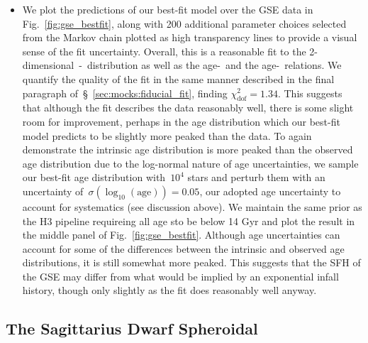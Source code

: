 \documentclass[ms.tex]{subfiles}
\begin{document}
\begin{itemize}
	\item We plot the predictions of our best-fit model over the GSE data in
	Fig.~\ref{fig:gse_bestfit}, along with 200 additional parameter choices
	selected from the Markov chain plotted as high transparency lines to
	provide a visual sense of the fit uncertainty.
	Overall, this is a reasonable fit to the
	2-dimensional~\afe-\feh~distribution as well as the age-\feh~and the
	age-\afe~relations.
	We quantify the quality of the fit in the same manner described in the
	final paragraph of~\S~\ref{sec:mocks:fiducial_fit}, finding
	$\chi_\text{dof}^2 = 1.34$.
	This suggests that although the fit describes the data reasonably well,
	there is some slight room for improvement, perhaps in the age distribution
	which our best-fit model predicts to be slightly more peaked than the data.
	To again demonstrate the intrinsic age distribution is more peaked than the
	observed age distribution due to the log-normal nature of age uncertainties,
	we sample our best-fit age distribution with~$10^4$ stars and perturb them
	with an uncertainty of~$\sigma(\log_{10}(\text{age})) = 0.05$, our adopted
	age uncertainty to account for systematics (see discussion above).
	We maintain the same prior as the H3 pipeline requireing all age sto be
	below 14 Gyr and plot the result in the middle panel of
	Fig.~\ref{fig:gse_bestfit}.
	Although age uncertainties can account for some of the differences between
	the intrinsic and observed age distributions, it is still somewhat more
	peaked.
	This suggests that the SFH of the GSE may differ from what would be implied
	by an exponential infall history, though only slightly as the fit does
	reasonably well anyway.

\end{itemize}

\subsection{The Sagittarius Dwarf Spheroidal}
\label{sec:h3:sgr}
\end{document}
